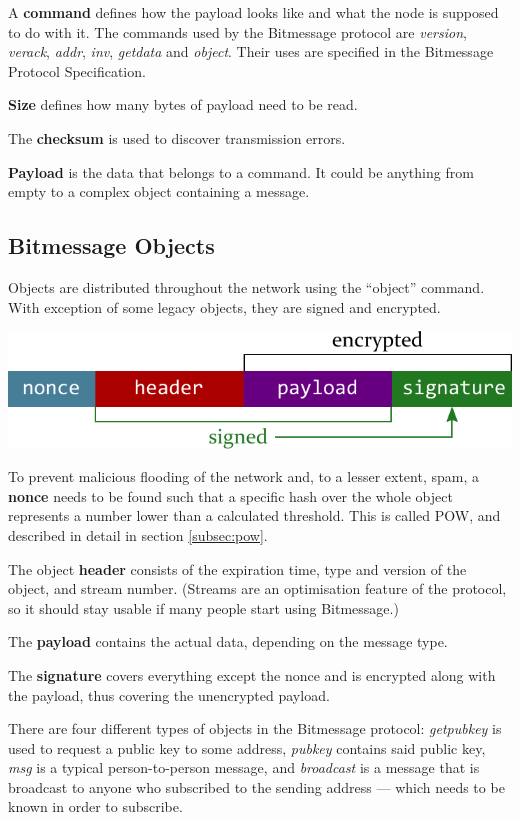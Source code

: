 \documentclass{bfh}
\begin{document}
  A \textbf{command} defines how the payload looks like and what the node is supposed to do with it. The commands used by the Bitmessage protocol are \textit{version}, \textit{verack}, \textit{addr}, \textit{inv}, \textit{getdata} and \textit{object}. Their uses are specified in the Bitmessage Protocol Specification.\cite{wiki:protocol}

  \textbf{Size} defines how many bytes of payload need to be read.

  The \textbf{checksum} is used to discover transmission errors.

  \textbf{Payload} is the data that belongs to a command. It could be anything from empty to a complex object containing a message.


  \subsection{Bitmessage Objects}
  Objects are distributed throughout the network using the ``object'' command. With exception of some legacy objects, they are signed and encrypted.

  \includegraphics[width=\textwidth]{images/object.pdf}

  To prevent malicious flooding of the network and, to a lesser extent, spam, a \textbf{nonce} needs to be found such that a specific hash over the whole object represents a number lower than a calculated threshold. This is called \acf{POW}, and described in detail in section \ref{subsec:pow}.

  The object \textbf{header} consists of the expiration time, type and version of the object, and stream number. (Streams are an optimisation feature of the protocol, so it should stay usable if many people start using Bitmessage.)
  
  The \textbf{payload} contains the actual data, depending on the message type.
  
  The \textbf{signature} covers everything except the nonce and is encrypted along with the payload, thus covering the unencrypted payload.

  There are four different types of objects in the Bitmessage protocol: \textit{getpubkey} is used to request a public key to some address, \textit{pubkey} contains said public key, \textit{msg} is a typical person-to-person message, and \textit{broadcast} is a message that is broadcast to anyone who subscribed to the sending address --- which needs to be known in order to subscribe.
\end{document}
